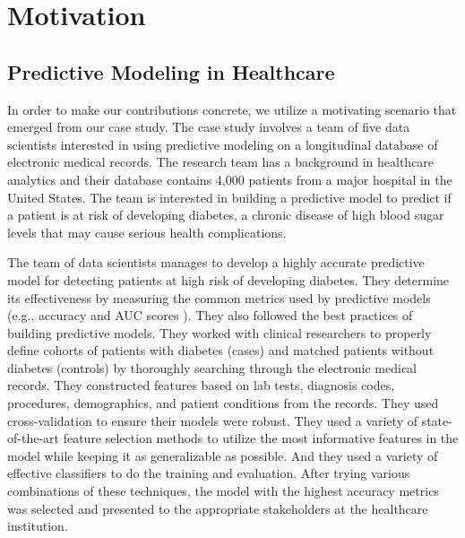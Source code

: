 
\section{Motivation}



\subsection{Predictive Modeling in Healthcare}

In order to make our contributions concrete, we utilize a motivating scenario that emerged from our case study.  The case study involves a team of five data scientists interested in using predictive modeling on a longitudinal database of electronic medical records. The research team has a background in healthcare analytics and their database contains 4,000 patients from a major hospital in the United States. The team is interested in building a predictive model to predict if a patient is at risk of developing diabetes, a chronic disease of high blood sugar levels that may cause serious health complications.



The team of data scientists manages to develop a highly accurate predictive model for detecting patients at high risk of developing diabetes.  They determine its effectiveness by measuring the common metrics used by predictive models (e.g., accuracy and AUC scores \cite{kuhn2013applied}).  They also followed the best practices of building predictive models.  They worked with clinical researchers to properly define cohorts of patients with diabetes (cases) and matched patients without diabetes (controls) by thoroughly searching through the electronic medical records.  They constructed features based on lab tests, diagnosis codes, procedures, demographics, and patient conditions from the records.  They used cross-validation to ensure their models were robust.  They used a variety of state-of-the-art feature selection methods to utilize the most informative features in the model while keeping it as generalizable as possible.  And they used a variety of effective classifiers to do the training and evaluation.  After trying various combinations of these techniques, the model with the highest accuracy metrics was selected and presented to the appropriate stakeholders at the healthcare institution.

